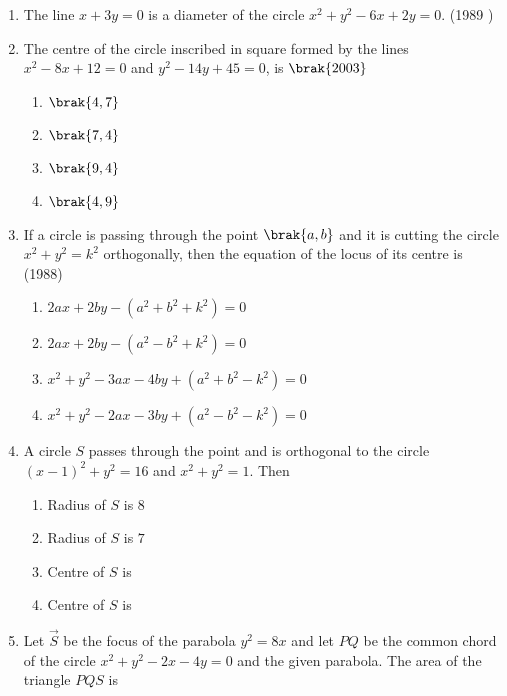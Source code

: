 \begin{enumerate}[label=\thesubsection.\arabic*.,ref=\thesubsection.\theenumi]
    \item The line $x+3y = 0$ is a diameter of the circle $ x^{2} + y^{2} - 6x +2y = 0$.
    \hfill{(1989 )}
     \item The centre of the circle inscribed in square formed by the lines $x^2-8x+12=0$ and $y^2-14y+45=0$,  is
         \hfill$\brak{2003}$
         \begin{multicols}{4}
\begin{enumerate}
         \item $\brak{4, 7}$
         \item $\brak{7, 4}$
         \item $\brak{9, 4}$
         \item $\brak{4, 9}$
     \end{enumerate}
     \end{multicols}
    \item If a circle is passing through the point $\brak{a, b}$ and it is cutting the circle $x^{2}+y^{2}=k^{2}$ orthogonally,  then the equation of the locus of its centre is 
    \hfill {(1988)}
    \begin{multicols}{2}
\begin{enumerate}
    	\item $2ax + 2by - (a^{2}+b^{2}+k^{2}) = 0$
    	\item $2ax + 2by - (a^{2}-b^{2}+k^{2}) = 0$
    	\item $x^{2} + y^{2}-3ax-4by+ (a^{2}+b^{2}-k^{2}) = 0$
    	\item $x^{2} + y^{2}-2ax-3by+ (a^{2}-b^{2}-k^{2}) = 0$
    \end{enumerate}
\end{multicols}
%
\item A circle $S$ passes through the point  and is orthogonal to the circle $(x-1)^2+y^2=16$ and $x^2+y^2=1$. Then
%
\hfill {}
\begin{multicols}{2}
\begin{enumerate}
\item Radius of $S$ is $8$
\item Radius of $S$ is $7$
\item Centre of $S$ is 
\item Centre of $S$ is 
\end{enumerate}
\end{multicols}
\item Let $\Vec{S}$ be the focus of the parabola $y^2=8x$ and let $PQ$ be the common chord of the circle $x^2+y^2-2x-4y=0$ and the given parabola. The area of the triangle $PQS$ is


\end{enumerate}
